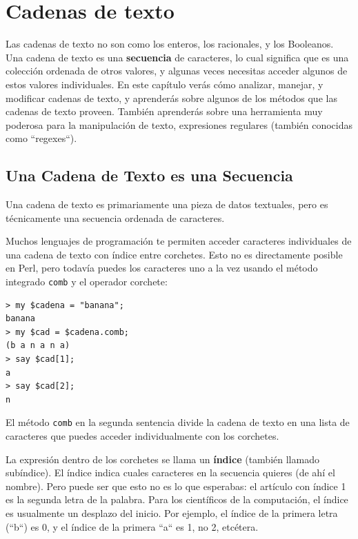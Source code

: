 
\chapter{Cadenas de texto}
\label{strings}

Las cadenas de texto no son como los enteros, los racionales,
y los Booleanos. Una cadena de texto es una {\bf secuencia} de caracteres,
lo cual significa que es una colección ordenada de otros valores,
y algunas veces necesitas acceder algunos de estos valores individuales.
En este capítulo verás cómo analizar, manejar, y modificar cadenas
de texto, y aprenderás sobre algunos de los métodos que las
cadenas de texto proveen. También aprenderás sobre una
herramienta muy poderosa para la manipulación de texto, 
expresiones regulares (también conocidas como ``regexes``).


\section{Una Cadena de Texto es una Secuencia}

Una cadena de texto es primariamente una pieza de datos textuales,
pero es técnicamente una secuencia ordenada de caracteres.

Muchos lenguajes de programación te permiten acceder caracteres
individuales de una cadena de texto con índice entre corchetes. 
Esto no es directamente posible en Perl, pero todavía puedes
los caracteres uno a la vez usando el método integrado {\tt comb} 
y el operador corchete:

\begin{lstlisting}
> my $cadena = "banana";
banana
> my $cad = $cadena.comb;
(b a n a n a)
> say $cad[1];
a
> say $cad[2];
n
\end{lstlisting}
%
El método {\tt comb} en la segunda sentencia divide la cadena de texto
en una lista de caracteres que puedes acceder individualmente con
los corchetes.

La expresión dentro de los corchetes se llama un {\bf índice}
(también llamado subíndice). El índice indica cuales 
caracteres en la secuencia quieres (de ahí el nombre). Pero
puede ser que esto no es lo que esperabas: el artículo con
índice 1 es la segunda letra de la palabra. Para los
científicos de la computación, el índice es usualmente
un desplazo del inicio. Por ejemplo, el índice de la primera 
letra (``b``) es 0, y el índice de la primera ``a`` es 1,
no 2, etcétera.

